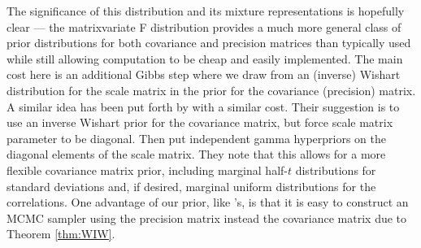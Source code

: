 \documentclass{article}\usepackage[]{graphicx}\usepackage[]{color}
\begin{document}
The significance of this distribution and its mixture representations is hopefully clear --- the matrixvariate F distribution provides a much more general class of prior distributions for both covariance and precision matrices than typically used while still allowing computation to be cheap and easily implemented. The main cost here is an additional Gibbs step where we draw from an (inverse) Wishart distribution for the scale matrix in the prior for the covariance (precision) matrix. A similar idea has been put forth by \cite{huang2013simple} with a similar cost. Their suggestion is to use an inverse Wishart prior for the covariance matrix, but force scale matrix parameter to be diagonal. Then put independent gamma hyperpriors on the diagonal elements of the scale matrix. They note that this allows for a more flexible covariance matrix prior, including marginal half-$t$ distributions for standard deviations and, if desired, marginal uniform distributions for the correlations. One advantage of our prior, like \citeauthor{huang2013simple}'s,  is that it is easy to construct an MCMC sampler using the precision matrix instead the covariance matrix due to Theorem \eqref{thm:WIW}.



\end{document}
